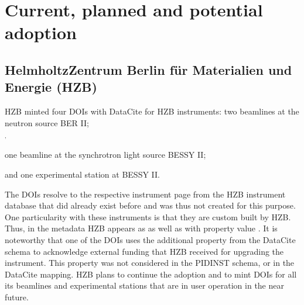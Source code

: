 \documentclass[a4paper,10pt,english]{sphinxmanual}
\begin{document}
\section{Current, planned and potential adoption}
\label{\detokenize{white-paper/adoption:current-planned-and-potential-adoption}}\label{\detokenize{white-paper/adoption::doc}}

\subsection{Helmholtz\sphinxhyphen{}Zentrum Berlin für Materialien und Energie (HZB)}
\label{\detokenize{white-paper/adoption:helmholtz-zentrum-berlin-fur-materialien-und-energie-hzb}}
\sphinxAtStartPar
HZB minted four DOIs with DataCite for HZB instruments: two beamlines
at the neutron source BER II;%
\begin{footnote}[1]\sphinxAtStartFootnote
{}
%
\end{footnote}$^{\text{,}}$%
\begin{footnote}[2]\sphinxAtStartFootnote
{}
%
\end{footnote} one
beamline at the synchrotron light source BESSY II;%
\begin{footnote}[3]\sphinxAtStartFootnote
{}
%
\end{footnote} and
one experimental station at BESSY II.%
\begin{footnote}[4]\sphinxAtStartFootnote
{}
%
\end{footnote} The DOIs resolve
to the respective instrument page from the HZB instrument database
that did already exist before and was thus not created for this
purpose.  One particularity with these instruments is that they are
custom built by HZB.  Thus, in the metadata HZB appears as 
as well as  with property  value
.  It is noteworthy that one of the DOIs uses the
additional property  from the DataCite schema to
acknowledge external funding that HZB received for upgrading the
instrument.  This property was not considered in the PIDINST schema,
or in the DataCite mapping.  HZB plans to continue the adoption and to
mint DOIs for all its beamlines and experimental stations that are in
user operation in the near future.
\end{document}
